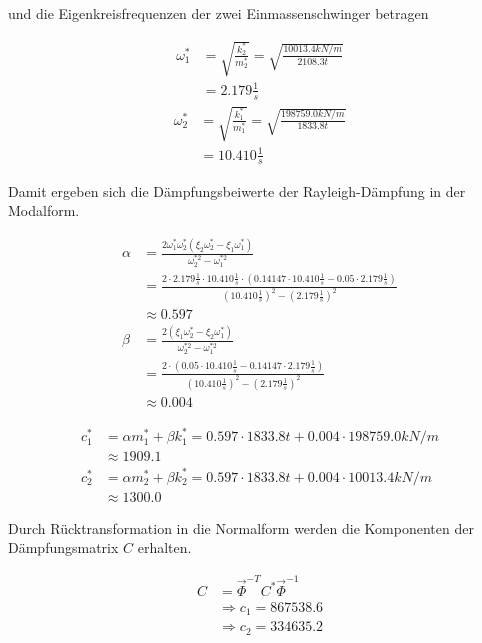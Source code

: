 und die Eigenkreisfrequenzen der zwei Einmassenschwinger betragen

\begin{align*}
\omega_1^* &= \sqrt{\frac{k_2^*}{m_2^*}} = \sqrt{\frac{10013.4 kN/m}{2108.3 t}}\\
           &= 2.179 \frac{1}{s}
\end{align*}
\begin{align*}
\omega_2^* &= \sqrt{\frac{k_1^*}{m_1^*}} = \sqrt{\frac{198759.0 kN/m}{1833.8 t}}\\
           &= 10.410 \frac{1}{s}
\end{align*}

\pagebreak

Damit ergeben sich die Dämpfungsbeiwerte der Rayleigh-Dämpfung in der Modalform.

\begin{align*}
\alpha &= \frac{2 \omega_1^* \omega_2^* (\xi_2 \omega_2^* - \xi_1 \omega_1^*)}{\omega_2^{*2} - \omega_1^{*2}}\\
       &= \frac{2 \cdot 2.179 \frac{1}{s} \cdot 10.410 \frac{1}{s} \cdot (0.14147 \cdot 10.410 \frac{1}{s} - 0.05 \cdot 2.179 \frac{1}{s})}{(10.410 \frac{1}{s})^2 - (2.179 \frac{1}{s})^2}\\
       &\approx 0.597\\[2em]
\beta  &= \frac{2 (\xi_1 \omega_2^* - \xi_2 \omega_1^*)}{\omega_2^{*2} - \omega_1^{*2}}\\
       &= \frac{2 \cdot (0.05 \cdot 10.410 \frac{1}{s} - 0.14147 \cdot 2.179 \frac{1}{s})}{(10.410 \frac{1}{s})^2 - (2.179 \frac{1}{s})^2}\\
       &\approx 0.004
\end{align*}

\begin{align*}
c_1^* &= \alpha m_1^* + \beta k_1^* = 0.597 \cdot 1833.8 t + 0.004 \cdot 198759.0 kN/m\\
      &\approx 1909.1\\
c_2^* &= \alpha m_2^* + \beta k_2^* = 0.597 \cdot 1833.8 t + 0.004 \cdot 10013.4 kN/m\\
      &\approx 1300.0
\end{align*}

Durch Rücktransformation in die Normalform werden die Komponenten der Dämpfungsmatrix $C$ erhalten.

\begin{align*}
C &= \vec{\Phi}^{-T} C^* \vec{\Phi}^{-1}\\
  &\Rightarrow c_1 = 867538.6\\
  &\Rightarrow c_2 = 334635.2
\end{align*}

